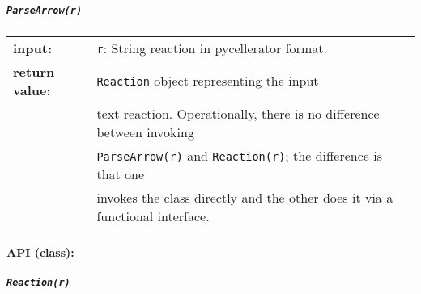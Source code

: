 \subparagraph{\tt ParseArrow(r)\\}

\begin{tabular}{ll}
\textbf{input:} & {\tt r}: String reaction in pycellerator format. \\
\textbf{return value:} & {\tt Reaction} object representing the input \\
& text reaction.  Operationally, there is no difference between invoking \\
& {\tt ParseArrow(r)} and {\tt Reaction(r)}; the difference is that one \\
& invokes the class directly and the other does it via a functional interface.
\end{tabular}


\paragraph{API (class):}

\subparagraph{\tt Reaction(r)\\}

